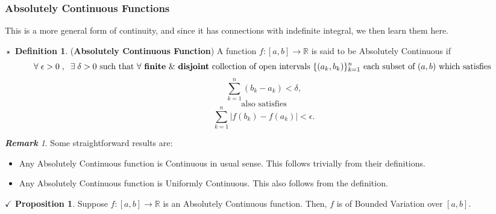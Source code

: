 \documentclass{article}
\theoremstyle{definition}
\newtheorem{definition}{$\boxed{\star}$ Definition}
\theoremstyle{remark}
\newtheorem*{remark}{\textbf{Remark}}
\theoremstyle{definition}
\theoremstyle{definition}
\newtheorem{proposition}{$\checkmark$ Proposition}
\theoremstyle{definition}
\newcommand{\abs}[1]{\left \vert #1\right \vert}
\newcommand{\R}{\mathbb{R}}
\begin{document}
\subsubsection{Absolutely Continuous Functions}
This is a more general form of continuity, and since it has connections with indefinite integral, we then learn them here.
\begin{definition}
	(\textbf{Absolutely Continuous Function}) A function $ f : [a,b] \longrightarrow\R $ is said to be Absolutely Continuous if
	\[\forall \;\epsilon > 0\;,\;\;\exists\;\delta > 0\text{ such that }\forall\text{ \textbf{finite} \& \textbf{disjoint} collection of open intervals }\{(a_k,b_k)\}_{k=1}^{n} \text{ each subset of }(a,b) \text{ which satisfies }\]
	\[\sum_{k=1}^{n}(b_k - a_k) < \delta,\]
	\[\text{also satisfies}\]
	\[\sum_{k=1}^{n} \abs{f(b_k) - f(a_k)} < \epsilon.\]
\end{definition}
\begin{remark} Some straightforward results are:
	\begin{itemize}
		\item {Any Absolutely Continuous function is Continuous in usual sense. This follows trivially from their definitions.}
		\item {Any Absolutely Continuous function is Uniformly Continuous. This also follows from the definition.}
	\end{itemize}
\end{remark}
\hrulefill
\begin{proposition}
	Suppose $ f : [a,b] \longrightarrow \R $ is an Absolutely Continuous function. Then, $ f $ is of Bounded Variation over $ [a,b] $.
\end{proposition}
\end{document}

